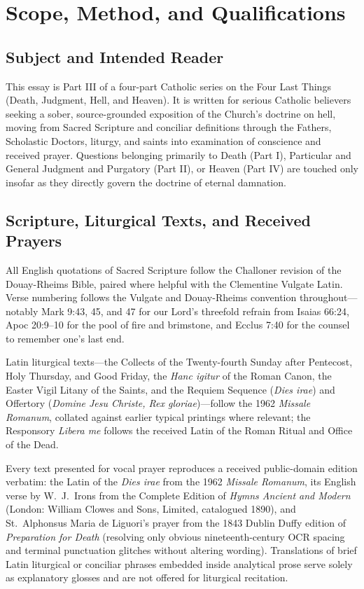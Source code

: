 \section{Scope, Method, and Qualifications}

\subsection*{Subject and Intended Reader}

This essay is Part III of a four-part Catholic series on the Four Last Things (Death, Judgment, Hell, and Heaven). It is written for serious Catholic believers seeking a sober, source-grounded exposition of the Church's doctrine on hell, moving from Sacred Scripture and conciliar definitions through the Fathers, Scholastic Doctors, liturgy, and saints into examination of conscience and received prayer. Questions belonging primarily to Death (Part I), Particular and General Judgment and Purgatory (Part II), or Heaven (Part IV) are touched only insofar as they directly govern the doctrine of eternal damnation.

\subsection*{Scripture, Liturgical Texts, and Received Prayers}

All English quotations of Sacred Scripture follow the Challoner revision of the Douay-Rheims Bible, paired where helpful with the Clementine Vulgate Latin. Verse numbering follows the Vulgate and Douay-Rheims convention throughout---notably Mark 9:43, 45, and 47 for our Lord's threefold refrain from Isaias 66:24, Apoc 20:9--10 for the pool of fire and brimstone, and Ecclus 7:40 for the counsel to remember one's last end.

Latin liturgical texts---the Collects of the Twenty-fourth Sunday after Pentecost, Holy Thursday, and Good Friday, the \textit{Hanc igitur} of the Roman Canon, the Easter Vigil Litany of the Saints, and the Requiem Sequence (\textit{Dies irae}) and Offertory (\textit{Domine Jesu Christe, Rex gloriae})---follow the 1962 \textit{Missale Romanum}, collated against earlier typical printings where relevant; the Responsory \textit{Libera me} follows the received Latin of the Roman Ritual and Office of the Dead.

Every text presented for vocal prayer reproduces a received public-domain edition verbatim: the Latin of the \textit{Dies irae} from the 1962 \textit{Missale Romanum}, its English verse by W.\ J.\ Irons from the Complete Edition of \textit{Hymns Ancient and Modern} (London: William Clowes and Sons, Limited, catalogued 1890), and St.\ Alphonsus Maria de Liguori's prayer from the 1843 Dublin Duffy edition of \textit{Preparation for Death} (resolving only obvious nineteenth-century OCR spacing and terminal punctuation glitches without altering wording). Translations of brief Latin liturgical or conciliar phrases embedded inside analytical prose serve solely as explanatory glosses and are not offered for liturgical recitation.

